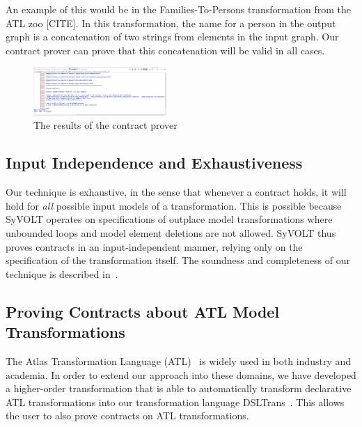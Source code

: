  An example of this
would be in the Families-To-Persons transformation from the ATL zoo [CITE]. In
this transformation, the name for a person in the output graph is a
concatenation of two strings  from elements in the input
graph. Our contract prover can prove that this concatenation will be valid in
all cases.

\begin{figure}
\centering
\includegraphics[width=0.45\textwidth]{figures/output}
\caption{The results of the contract prover}
\label{fig:output}
\end{figure}

\subsection{Input Independence and Exhaustiveness} 

Our technique is exhaustive, in the sense that whenever a contract holds, it
will hold for \emph{all} possible input models of a transformation. This is
possible because SyVOLT operates on specifications of outplace model transformations where unbounded loops and model element
deletions are not allowed. SyVOLT thus proves contracts in an input-independent
manner, relying only on the specification of the transformation itself. The
soundness and completeness of our technique is described in~\cite{Lucio2014}.

\subsection{Proving Contracts about ATL Model Transformations}

 The Atlas
Transformation Language (ATL)~\cite{atlTool} is widely used in both industry and
academia. In order to extend our approach into these domains, we have developed a higher-order
transformation that is able to automatically transform declarative ATL
transformations into our transformation language DSLTrans~\cite{Oakes}. This
allows the user to also prove contracts on ATL transformations.

